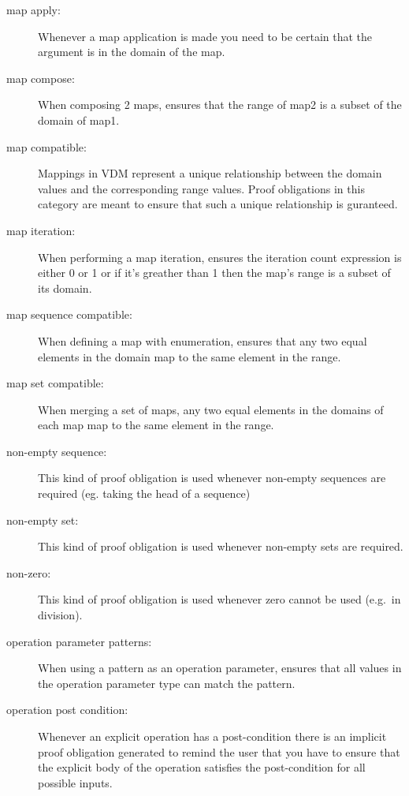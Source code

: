 \begin{description}
\item[map apply:] Whenever a map application is made you need to be
  certain that the argument is in the domain of the map.

\item[map compose:] When composing 2 maps, ensures that the
range of map2 is a subset of the domain of map1. 

\item[map compatible:] Mappings in VDM represent a unique relationship
  between the domain values and the corresponding range values. Proof
  obligations in this category are meant to ensure that such a unique
  relationship is guranteed.

\item[map iteration:] When performing a map iteration, ensures the iteration
    count expression is either 0 or 1 or if it's greather than 1 then the map's
    range is a subset of its domain. 

\item[map sequence compatible:] When defining a map with enumeration, ensures that
    any two equal elements in the domain map to the same element in the range.

\item[map set compatible:] When merging a set of maps, any two equal elements in
    the domains of each map map to the same element in the range.

\item[non-empty sequence:] This kind of proof obligation is used whenever
  non-empty sequences are required (eg. taking the head of a sequence)

\item[non-empty set:] This kind of proof obligation is used whenever
  non-empty sets are required.

\item[non-zero:] This kind of proof obligation is used whenever zero
  cannot be used (e.g.\ in division).

\item[operation parameter patterns:] When using a pattern as an operation
    parameter, ensures that all values in the operation parameter type can
    match the pattern.


\item[operation post condition:] Whenever an explicit operation has a
  post-condition there is an implicit proof obligation generated to
  remind the user that you have to ensure that the explicit body
  of the operation satisfies the post-condition for all possible inputs.


\end{description}
